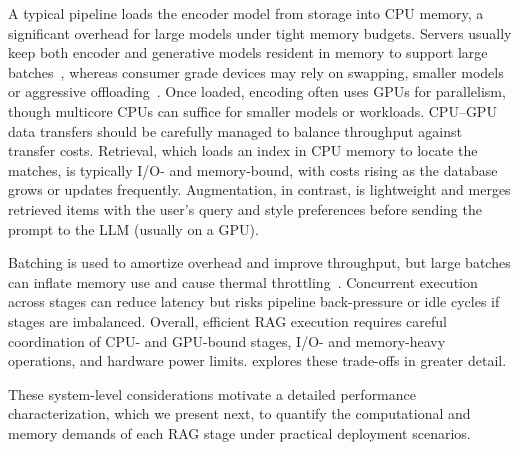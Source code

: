 A typical pipeline loads the encoder model from storage into CPU memory, a significant overhead for large models under tight memory budgets. Servers usually keep both encoder and generative models resident in memory to support large batches~\cite{jiang2024piperag, jin2024flashrag, jiang2024megascale}, whereas consumer grade devices may rely on swapping,
smaller models or aggressive offloading~\cite{EdgeRAG,NanoLLM}. Once loaded, encoding often uses GPUs for parallelism, though multicore CPUs can suffice for smaller models or workloads. CPU–GPU data transfers should be carefully managed to balance throughput against transfer costs. Retrieval, which loads an index in CPU memory to locate the \topk{} matches, is typically I/O- and memory-bound, with costs rising as the database grows or updates frequently. Augmentation, in contrast, is lightweight and merges retrieved items with the user’s query and style preferences before sending the prompt to the LLM (usually on a GPU). 

Batching is used to amortize overhead and improve throughput, but large batches can inflate memory use and cause thermal throttling~\cite{na2021scalable, stojkovic2025tapas}. Concurrent execution across stages can reduce latency but risks pipeline back-pressure or idle cycles if stages are imbalanced. Overall, efficient RAG execution requires careful coordination of CPU- and GPU-bound stages, I/O- and memory-heavy operations, and hardware power limits.  explores these trade-offs in greater detail.

These system-level considerations motivate a detailed performance characterization, which we present next, to quantify the computational and memory demands of each RAG stage under practical deployment scenarios.


